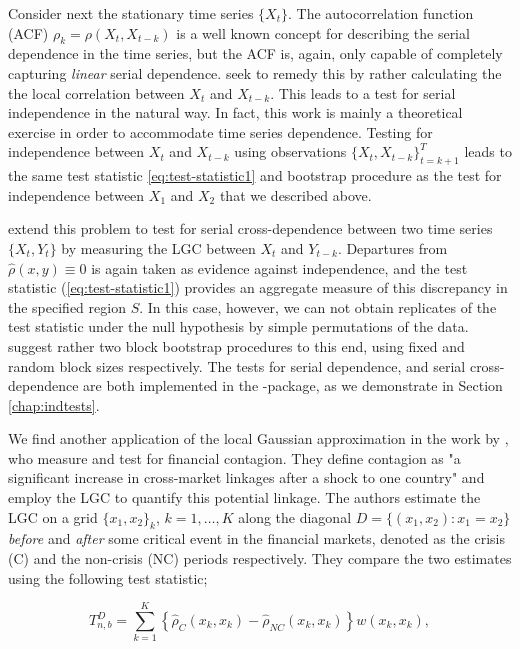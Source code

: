 Consider next the stationary time series $\{X_t\}$. The autocorrelation function (ACF) $\rho_k = \rho(X_t, X_{t-k})$ is a well known concept for describing the serial dependence in the time series, but the ACF is, again, only capable of completely capturing \emph{linear} serial dependence. \citet{laca:tjos:2017} seek to remedy this by rather calculating the the local correlation between $X_t$ and $X_{t-k}$. This leads to a test for serial independence in the natural way. In fact, this work is mainly a theoretical exercise in order to accommodate time series dependence. Testing for independence between $X_t$ and $X_{t-k}$ using observations $\{X_t, X_{t-k}\}_{t = k+1}^T$ leads to the same test statistic \eqref{eq:test-statistic1} and bootstrap procedure as the test for independence between $X_1$ and $X_2$ that we described above. 

\citet{laca:tjos:2018} extend this problem to test for serial cross-dependence between two time series $\{X_t, Y_t\}$ by measuring the LGC between $X_t$ and $Y_{t-k}$. Departures from $\widehat\rho(x,y) \equiv 0$ is again taken as evidence against independence, and the test statistic (\ref{eq:test-statistic1}) provides an aggregate measure of this discrepancy in the specified region $S$. In this case, however, we can not obtain replicates of the test statistic under the null hypothesis by simple permutations of the data. \citet{laca:tjos:2018} suggest rather two block bootstrap procedures to this end, using fixed and random block sizes respectively. The tests for serial dependence, and serial cross-dependence are both implemented in the -package, as we demonstrate in Section \ref{chap:indtests}.

We find another application of the local Gaussian approximation in the work by \citet{stov:tjos:huft:2014}, who measure and test for financial contagion. They define contagion as "a significant increase in cross-market linkages after a shock to one country" \citep{forb:rigo:2002} and employ the LGC to quantify this potential linkage. The authors estimate the LGC on a grid $\{x_1, x_2\}_k$, $k=1,\ldots,K$ along the diagonal $D=\{(x_1,x_2): x_1 = x_2\}$ \emph{before} and \emph{after} some critical event in the financial markets, denoted as the crisis (C) and the non-crisis (NC) periods respectively. They compare the two estimates using the following test statistic; 

$$T_{n,b}^D = \sum_{k=1}^K \left\{\widehat\rho_C(x_k, x_k) - \widehat\rho_{NC}(x_k, x_k) \right\}w(x_k,x_k),$$

